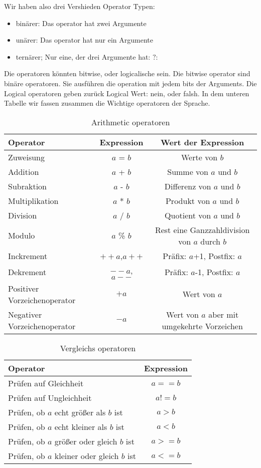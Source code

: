 Wir haben also drei Vershieden Operator Typen:
\begin{itemize}
\item binärer: Das operator hat zwei Argumente
\item unärer: Das operator hat nur ein Argumente
\item ternärer; Nur eine, der drei Argumente hat: $?:$
\end{itemize} 

Die operatoren könnten bitwise, oder logicalische sein. Die bitwise operator sind binäre operatoren. Sie ausführen die operation mit jedem bits der Arguments.
Die Logical operatoren geben zurück Logical Wert: nein, oder falsh. In dem unteren Tabelle wir fassen zusammen die Wichtige operatoren der Sprache.

\begin{table}
\caption{Arithmetic operatoren \label{oper}}
\centering
\begin{tabular}{|l c c|}
\hline
Operator & Expression & Wert der Expression \\
\hline
Zuweisung & $a$ = $b$ & Werte von $b$ \\
Addition & $a$ + $b$ & Summe von $a$ und $b$ \\
Subraktion & $a$ - $b$ & Differenz von $a$ und $b$ \\
Multiplikation & $a$ * $b$ & Produkt von $a$ und $b$ \\
Division & $a$ / $b$ & Quotient von $a$ und $b$ \\
Modulo & $a$ \% $b$ & Rest eine Ganzzahldivision von $a$ durch $b$ \\
Inckrement & $++a$,$a++$ & Präfix: $a$+1, Postfix: $a$ \\
Dekrement & $--a$, $a--$ & Präfix: $a$-1, Postfix: $a$ \\
Positiver Vorzeichenoperator & $+a$ & Wert von $a$ \\
Negativer Vorzeichenoperator & $-a$ & Wert von $a$ aber mit umgekehrte Vorzeichen \\
\hline
\end{tabular}
\end{table}

\begin{table}
\caption{Vergleichs operatoren \label{vergoper}}
\centering
\begin{tabular}{|l c|}
\hline
Operator & Expression \\
\hline
Prüfen auf Gleichheit & $a == b$  \\
Prüfen auf Ungleichheit & $a != b$ \\
Prüfen, ob $a$ echt größer als $b$ ist & $a>b$ \\
Prüfen, ob $a$ echt kleiner als $b$ ist & $a<b$ \\
Prüfen, ob $a$ größer oder gleich $b$ ist & $a>=b$ \\
Prüfen, ob $a$ kleiner oder gleich $b$ ist & $a<=b$ \\
\hline
\end{tabular}
\end{table}

